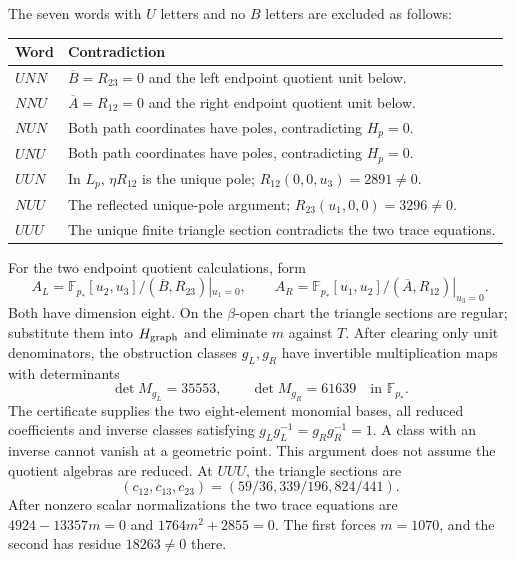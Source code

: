 \documentclass[11pt,a4paper]{article}
\theoremstyle{remark}\newtheorem{remark}[theorem]{Remark}
\newcommand{\Ab}{\overline A}\newcommand{\Bb}{\overline B}
\begin{document}
The seven words with $U$ letters and no $B$ letters are excluded as follows:
\begin{center}\small
\begin{tabular}{@{}ll@{}}\toprule
Word & Contradiction\\\midrule
$UNN$ & $\Bb=R_{23}=0$ and the left endpoint quotient unit below.\\
$NNU$ & $\Ab=R_{12}=0$ and the right endpoint quotient unit below.\\
$NUN$ & Both path coordinates have poles, contradicting $H_p=0$.\\
$UNU$ & Both path coordinates have poles, contradicting $H_p=0$.\\
$UUN$ & In $L_p$, $\eta R_{12}$ is the unique pole;
 $R_{12}(0,0,u_3)=2891\ne0$.\\
$NUU$ & The reflected unique-pole argument;
 $R_{23}(u_1,0,0)=3296\ne0$.\\
$UUU$ & The unique finite triangle section contradicts the two trace equations.\\
\bottomrule\end{tabular}
\end{center}
For the two endpoint quotient calculations, form
\[
 A_L=\mathbb F_{p_*}[u_2,u_3]/(\Bb,R_{23})|_{u_1=0},\qquad
 A_R=\mathbb F_{p_*}[u_1,u_2]/(\Ab,R_{12})|_{u_3=0}.
\]
Both have dimension eight. On the $\beta$-open chart the triangle sections
are regular; substitute them into $H_{\rm graph}$ and eliminate $m$
against $T$. After clearing only unit denominators, the obstruction classes
$g_L,g_R$ have invertible multiplication maps with determinants
\[
 \det M_{g_L}=35553,\qquad \det M_{g_R}=61639
 \quad\text{in }\mathbb F_{p_*}.
\]
The certificate supplies the two eight-element monomial bases, all reduced
coefficients and inverse classes satisfying $g_Lg_L^{-1}=g_Rg_R^{-1}=1$.
A class with an inverse cannot vanish at a geometric point. This argument
does not assume the quotient algebras are reduced.
At $UUU$, the triangle sections are
\[
 (c_{12},c_{13},c_{23})=(59/36,339/196,824/441).
\]
After nonzero scalar normalizations the two trace equations are
$4924-13357m=0$ and $1764m^2+2855=0$. The first forces $m=1070$,
and the second has residue $18263\ne0$ there.
\end{document}
